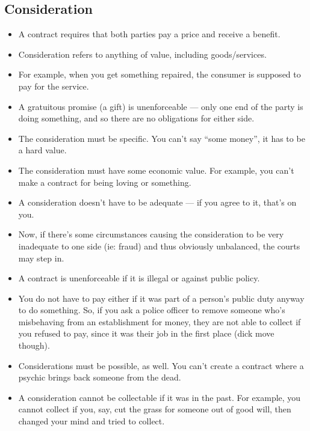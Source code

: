 \documentclass{article}
\begin{document}
\subsection{Consideration}
\begin{itemize}
    \item A contract requires that both parties pay a price and receive a benefit.
    \item Consideration refers to anything of value, including goods/services.
    \item For example, when you get something repaired, the consumer is supposed to pay for the service.
    \item A gratuitous promise (a gift) is unenforceable --- only one end of the party is doing something, and so there are no obligations for either side.
    \item The consideration must be specific.  You can't say ``some money'', it has to be a hard value.
    \item The consideration must have some economic value.  For example, you can't make a contract for being loving or something.
    \item A consideration doesn't have to be adequate --- if you agree to it, that's on you.
    \item Now, if there's some circumstances causing the consideration to be very inadequate to one side (ie: fraud) and thus obviously unbalanced, the courts may step in.
    \item A contract is unenforceable if it is illegal or against public policy.
    \item You do not have to pay either if it was part of a person's public duty anyway to do something.  So, if you ask a police officer to remove someone who's misbehaving from an establishment for money, they are not able to collect if you refused to pay, since it was their job in the first place (dick move though).
    \item Considerations must be possible, as well.  You can't create a contract where a psychic brings back someone from the dead.
    \item A consideration cannot be collectable if it was in the past.  For example, you cannot collect if you, say, cut the grass for someone out of good will, then changed your mind and tried to collect.
\end{itemize}
\end{document}
